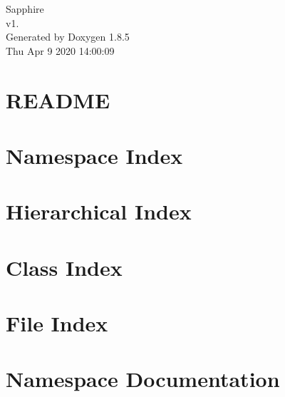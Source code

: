 \documentclass[twoside]{book}
\newcommand{\clearemptydoublepage}{%
  \newpage{\pagestyle{empty}\cleardoublepage}%
}
\begin{document}
\hypersetup{pageanchor=false}
\begin{titlepage}
\vspace*{7cm}
\begin{center}%
{\Large Sapphire \\[1ex]\large v1. }\\
\vspace*{1cm}
{\large Generated by Doxygen 1.8.5}\\
\vspace*{0.5cm}
{\small Thu Apr 9 2020 14:00:09}\\
\end{center}
\end{titlepage}
\clearemptydoublepage
\tableofcontents
\clearemptydoublepage
{}
\hypersetup{pageanchor=true}

\chapter{R\-E\-A\-D\-M\-E}
\label{d2/d9c/md__afs_crc_8nd_8edu_user_p_pscholz_Private_sapphire-devel_README}
\hypertarget{d2/d9c/md__afs_crc_8nd_8edu_user_p_pscholz_Private_sapphire-devel_README}{}

\chapter{Namespace Index}

\chapter{Hierarchical Index}

\chapter{Class Index}

\chapter{File Index}

\chapter{Namespace Documentation}




\end{document}
